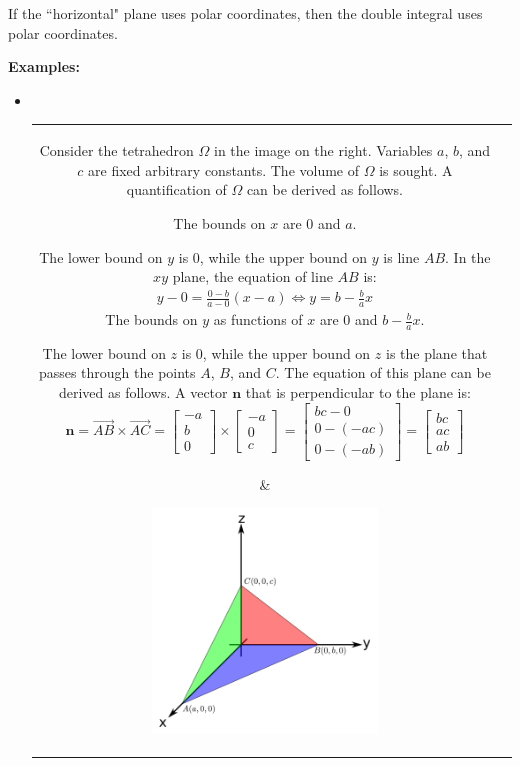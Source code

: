 \documentclass{article}
\begin{document}
If the ``horizontal" plane uses polar coordinates, then the double integral uses polar coordinates.

\vspace{5mm}

\textbf{Examples:}

\begin{itemize}
\item ~~\\

\begin{tabular}{cc}
\parbox{0.5\textwidth}{
Consider the tetrahedron \(\Omega\) in the image on the right. Variables \(a\), \(b\), and \(c\) are fixed arbitrary constants. The volume of \(\Omega\) is sought. A quantification of \(\Omega\) can be derived as follows. 

The bounds on \(x\) are \(0\) and \(a\). 

The lower bound on \(y\) is \(0\), while the upper bound on \(y\) is line \(AB\). In the \(xy\) plane, the equation of line \(AB\) is: 
\begin{align*}
y - 0 = \frac{0 - b}{a - 0}(x - a) \iff y = b - \frac{b}{a}x
\end{align*}
The bounds on \(y\) as functions of \(x\) are \(0\) and \(b - \frac{b}{a}x\). 

The lower bound on \(z\) is \(0\), while the upper bound on \(z\) is the plane that passes through the points \(A\), \(B\), and \(C\). The equation of this plane can be derived as follows. A vector \(\mathbf{n}\) that is perpendicular to the plane is:
\[\mathbf{n} = \overrightarrow{AB} \times \overrightarrow{AC} = \begin{bmatrix} -a \\ b \\ 0 \end{bmatrix} \times \begin{bmatrix} -a \\ 0 \\ c \end{bmatrix} = \begin{bmatrix} bc - 0 \\ 0 - (-ac) \\ 0 - (-ab) \end{bmatrix} = \begin{bmatrix} bc \\ ac \\ ab \end{bmatrix}\]
} & \parbox{0.5\textwidth}{
\includegraphics[width = 0.5\textwidth]{tetrahedron}
}
\end{tabular}


\end{itemize}
\end{document}
